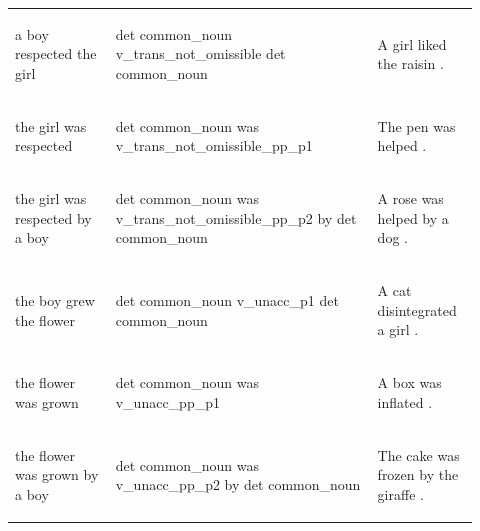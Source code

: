 \documentclass[11pt]{article}
\begin{document}
\begin{table}
\begin{tabular}{p{0.2\linewidth} p{0.52\linewidth} p{0.2\linewidth}}
\begin{small}a boy respected the girl\end{small} & \begin{small}det common\_noun v\_trans\_not\_omissible det common\_noun \end{small} & \begin{small}A girl liked the raisin .\end{small} \\
\begin{small}the girl was respected\end{small} & \begin{small}det common\_noun was v\_trans\_not\_omissible\_pp\_p1 \end{small} & \begin{small}The pen was helped .\end{small} \\
\begin{small}the girl was respected by a boy\end{small} & \begin{small}det common\_noun was v\_trans\_not\_omissible\_pp\_p2 by det common\_noun \end{small} & \begin{small}A rose was helped by a dog .\end{small} \\
\begin{small}the boy grew the flower\end{small} & \begin{small}det common\_noun v\_unacc\_p1 det common\_noun \end{small} & \begin{small}A cat disintegrated a girl .\end{small} \\
\begin{small}the flower was grown\end{small} & \begin{small}det common\_noun was v\_unacc\_pp\_p1 \end{small} & \begin{small}A box was inflated .\end{small} \\
\begin{small}the flower was grown by a boy\end{small} & \begin{small}det common\_noun was v\_unacc\_pp\_p2 by det common\_noun \end{small} & \begin{small}The cake was frozen by the giraffe .\end{small} \\

\end{tabular}
\end{table}
\end{document}
